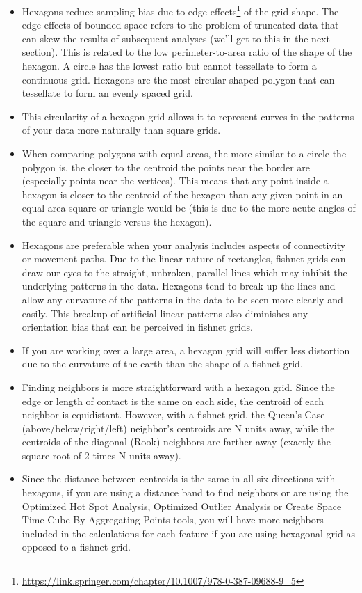 \documentclass[
]{book}
\providecommand{\tightlist}{%
  \setlength{\itemsep}{0pt}\setlength{\parskip}{0pt}}
\renewcommand{\href}[2]{#2\footnote{\url{#1}}}
\begin{document}
\begin{itemize}
\tightlist
\item
  Hexagons reduce sampling bias due to \href{https://link.springer.com/chapter/10.1007/978-0-387-09688-9_5}{edge effects} of the grid shape. The edge effects of bounded space refers to the problem of truncated data that can skew the results of subsequent analyses (we'll get to this in the next section). This is related to the low perimeter-to-area ratio of the shape of the hexagon. A circle has the lowest ratio but cannot tessellate to form a continuous grid. Hexagons are the most circular-shaped polygon that can tessellate to form an evenly spaced grid.
\item
  This circularity of a hexagon grid allows it to represent curves in the patterns of your data more naturally than square grids.
\item
  When comparing polygons with equal areas, the more similar to a circle the polygon is, the closer to the centroid the points near the border are (especially points near the vertices). This means that any point inside a hexagon is closer to the centroid of the hexagon than any given point in an equal-area square or triangle would be (this is due to the more acute angles of the square and triangle versus the hexagon).
\item
  Hexagons are preferable when your analysis includes aspects of connectivity or movement paths. Due to the linear nature of rectangles, fishnet grids can draw our eyes to the straight, unbroken, parallel lines which may inhibit the underlying patterns in the data. Hexagons tend to break up the lines and allow any curvature of the patterns in the data to be seen more clearly and easily. This breakup of artificial linear patterns also diminishes any orientation bias that can be perceived in fishnet grids.
\item
  If you are working over a large area, a hexagon grid will suffer less distortion due to the curvature of the earth than the shape of a fishnet grid.
\item
  Finding neighbors is more straightforward with a hexagon grid. Since the edge or length of contact is the same on each side, the centroid of each neighbor is equidistant. However, with a fishnet grid, the Queen's Case (above/below/right/left) neighbor's centroids are N units away, while the centroids of the diagonal (Rook) neighbors are farther away (exactly the square root of 2 times N units away).
\item
  Since the distance between centroids is the same in all six directions with hexagons, if you are using a distance band to find neighbors or are using the Optimized Hot Spot Analysis, Optimized Outlier Analysis or Create Space Time Cube By Aggregating Points tools, you will have more neighbors included in the calculations for each feature if you are using hexagonal grid as opposed to a fishnet grid.
\end{itemize}
\end{document}
